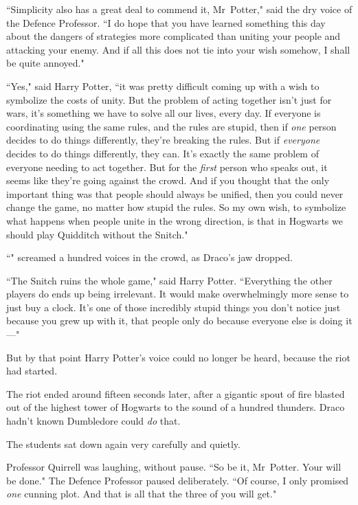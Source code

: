 ``Simplicity also has a great deal to commend it, Mr~Potter," said the dry voice of the Defence Professor. ``I do hope that you have learned something this day about the dangers of strategies more complicated than uniting your people and attacking your enemy. And if all this does not tie into your wish somehow, I shall be quite annoyed."

``Yes," said Harry Potter, ``it was pretty difficult coming up with a wish to symbolize the costs of unity. But the problem of acting together isn't just for wars, it's something we have to solve all our lives, every day. If everyone is coordinating using the same rules, and the rules are stupid, then if \emph{one} person decides to do things differently, they're breaking the rules. But if \emph{everyone} decides to do things differently, they can. It's exactly the same problem of everyone needing to act together. But for the \emph{first} person who speaks out, it seems like they're going against the crowd. And if you thought that the only important thing was that people should always be unified, then you could never change the game, no matter how stupid the rules. So my own wish, to symbolize what happens when people unite in the wrong direction, is that in Hogwarts we should play Quidditch without the Snitch."

``" screamed a hundred voices in the crowd, as Draco's jaw dropped.

``The Snitch ruins the whole game," said Harry Potter. ``Everything the other players do ends up being irrelevant. It would make overwhelmingly more sense to just buy a clock. It's one of those incredibly stupid things you don't notice just because you grew up with it, that people only do because everyone else is doing it—"

But by that point Harry Potter's voice could no longer be heard, because the riot had started.

\later

The riot ended around fifteen seconds later, after a gigantic spout of fire blasted out of the highest tower of Hogwarts to the sound of a hundred thunders. Draco hadn't known Dumbledore could \emph{do} that.

The students sat down again very carefully and quietly.

Professor Quirrell was laughing, without pause. ``So be it, Mr~Potter. Your will be done." The Defence Professor paused deliberately. ``Of course, I only promised \emph{one} cunning plot. And that is all that the three of you will get."

